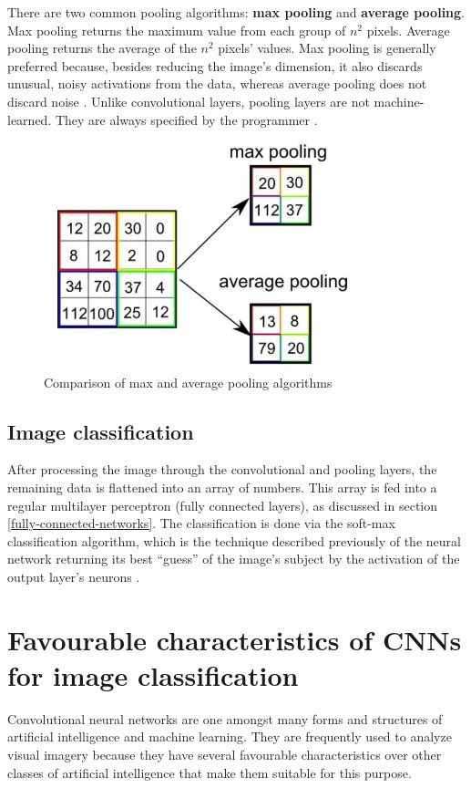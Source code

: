 ﻿\documentclass[12pt,a4paper,notitlepage]{article}
\begin{document}
There are two common pooling algorithms: \textbf{max pooling} and \textbf{average pooling}. Max pooling returns the maximum value from each group of \(n^2\) pixels. 
Average pooling returns the average of the \(n^2\) pixels' values. Max pooling is generally preferred because, besides reducing the image's dimension, it also discards unusual, noisy activations from the data, whereas average pooling does not discard noise \cite{saha_comprehensive_2018}.
Unlike convolutional layers, pooling layers are not machine-learned. They are always specified by the programmer \cite{brownlee_gentle_2019}.
\begin{figure}[htbp]
 \centering
  \includegraphics[width=0.80\textwidth]{images/pooling.jpg}
 \caption{Comparison of max and average pooling algorithms \cite{saha_comprehensive_2018}}
 \label{fig:pooling}
\end{figure}

\subsection{Image classification}
After processing the image through the convolutional and pooling layers, the remaining data is flattened into an array of numbers. This array is fed into a regular multilayer perceptron (fully connected layers), as discussed in section \ref{fully-connected-networks}. The classification is done via the soft-max classification algorithm, which is the technique described previously of the neural network returning its best “guess” of the image's subject by the activation of the output layer's neurons \cite{rosebrock_softmax_2016}.

\section{Favourable characteristics of CNNs for image classification}
Convolutional neural networks are one amongst many forms and structures of artificial intelligence and machine learning. They are frequently used to analyze visual imagery because they have several favourable characteristics over other classes of artificial intelligence that make them suitable for this purpose.
\end{document}
